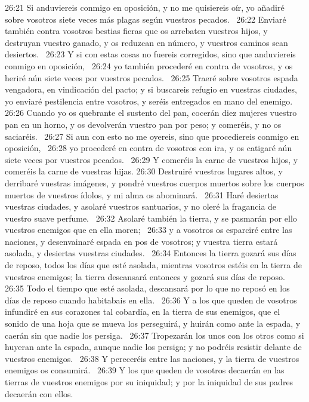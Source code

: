 26:21 Si anduviereis conmigo en oposición, y no me quisiereis oír, yo añadiré sobre vosotros siete veces más plagas según vuestros pecados.  
26:22 Enviaré también contra vosotros bestias fieras que os arrebaten vuestros hijos, y destruyan vuestro ganado, y os reduzcan en número, y vuestros caminos sean desiertos.  
26:23 Y si con estas cosas no fuereis corregidos, sino que anduviereis conmigo en oposición,  
26:24 yo también procederé en contra de vosotros, y os heriré aún siete veces por vuestros pecados.  
26:25 Traeré sobre vosotros espada vengadora, en vindicación del pacto; y si buscareis refugio en vuestras ciudades, yo enviaré pestilencia entre vosotros, y seréis entregados en mano del enemigo.  
26:26 Cuando yo os quebrante el sustento del pan, cocerán diez mujeres vuestro pan en un horno, y os devolverán vuestro pan por peso; y comeréis, y no os saciaréis.  
26:27 Si aun con esto no me oyereis, sino que procediereis conmigo en oposición,  
26:28 yo procederé en contra de vosotros con ira, y os catigaré aún siete veces por vuestros pecados.  
26:29 Y comeréis la carne de vuestros hijos, y comeréis la carne de vuestras hijas. 
26:30 Destruiré vuestros lugares altos, y derribaré vuestras imágenes, y pondré vuestros cuerpos muertos sobre los cuerpos muertos de vuestros ídolos, y mi alma os abominará.  
26:31 Haré desiertas vuestras ciudades, y asolaré vuestros santuarios, y no oleré la fragancia de vuestro suave perfume.  
26:32 Asolaré también la tierra, y se pasmarán por ello vuestros enemigos que en ella moren;  
26:33 y a vosotros os esparciré entre las naciones, y desenvainaré espada en pos de vosotros; y vuestra tierra estará asolada, y desiertas vuestras ciudades.  
26:34 Entonces la tierra gozará sus días de reposo, todos los días que esté asolada, mientras vosotros estéis en la tierra de vuestros enemigos; la tierra descansará entonces y gozará sus días de reposo.  
26:35 Todo el tiempo que esté asolada, descansará por lo que no reposó en los días de reposo cuando habitabais en ella.  
26:36 Y a los que queden de vosotros infundiré en sus corazones tal cobardía, en la tierra de sus enemigos, que el sonido de una hoja que se mueva los perseguirá, y huirán como ante la espada, y caerán sin que nadie los persiga.  
26:37 Tropezarán los unos con los otros como si huyeran ante la espada, aunque nadie los persiga; y no podréis resistir delante de vuestros enemigos.  
26:38 Y pereceréis entre las naciones, y la tierra de vuestros enemigos os consumirá.  
26:39 Y los que queden de vosotros decaerán en las tierras de vuestros enemigos por su iniquidad; y por la iniquidad de sus padres decaerán con ellos.  
